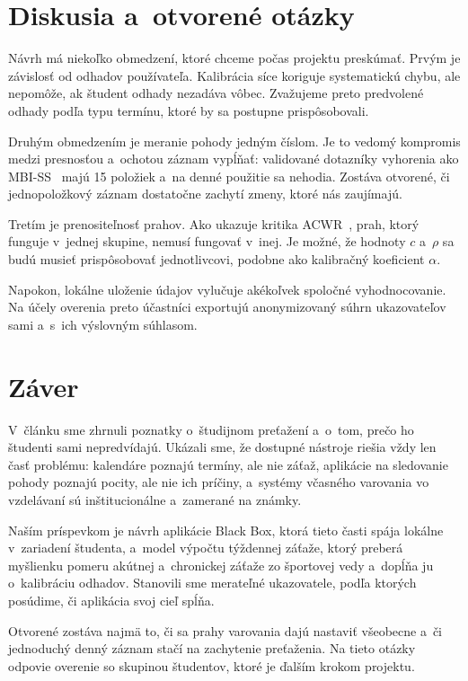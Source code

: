 \documentclass[10pt,twoside,slovak,a4paper]{article}
\begin{document}
\section{Diskusia a~otvorené otázky} \label{s:diskusia}

Návrh má niekoľko obmedzení, ktoré chceme počas projektu preskúmať.
Prvým je závislosť od odhadov používateľa. Kalibrácia síce koriguje
systematickú chybu, ale nepomôže, ak študent odhady nezadáva vôbec.
Zvažujeme preto predvolené odhady podľa typu termínu, ktoré by sa
postupne prispôsobovali.

Druhým obmedzením je meranie pohody jedným číslom. Je to vedomý kompromis
medzi presnosťou a~ochotou záznam vypĺňať: validované dotazníky vyhorenia
ako MBI-SS~\cite{Schaufeli:Burnout} majú 15 položiek a~na denné
použitie sa nehodia. Zostáva otvorené, či jednopoložkový záznam dostatočne
zachytí zmeny, ktoré nás zaujímajú.

Tretím je prenositeľnosť prahov. Ako ukazuje kritika ACWR~\cite{Impellizzeri:ACWR},
prah, ktorý funguje v~jednej skupine, nemusí fungovať v~inej. Je možné, že
hodnoty $c$ a~$\rho$ sa budú musieť prispôsobovať jednotlivcovi, podobne
ako kalibračný koeficient $\alpha$.

Napokon, lokálne uloženie údajov vylučuje akékoľvek spoločné
vyhodnocovanie. Na účely overenia preto účastníci exportujú anonymizovaný
súhrn ukazovateľov sami a~s~ich výslovným súhlasom.



\section{Záver} \label{s:zaver}

V~článku sme zhrnuli poznatky o~študijnom preťažení a~o~tom, prečo ho
študenti sami nepredvídajú. Ukázali sme, že dostupné nástroje riešia vždy
len časť problému: kalendáre poznajú termíny, ale nie záťaž, aplikácie na
sledovanie pohody poznajú pocity, ale nie ich príčiny, a~systémy včasného
varovania vo vzdelávaní sú inštitucionálne a~zamerané na známky.

Naším príspevkom je návrh aplikácie Black Box, ktorá tieto časti spája
lokálne v~zariadení študenta, a~model výpočtu týždennej záťaže, ktorý
preberá myšlienku pomeru akútnej a~chronickej záťaže zo športovej vedy
a~dopĺňa ju o~kalibráciu odhadov. Stanovili sme merateľné ukazovatele, podľa
ktorých posúdime, či aplikácia svoj cieľ spĺňa.

Otvorené zostáva najmä to, či sa prahy varovania dajú nastaviť všeobecne
a~či jednoduchý denný záznam stačí na zachytenie preťaženia. Na tieto
otázky odpovie overenie so skupinou študentov, ktoré je ďalším krokom
projektu.






\end{document}
